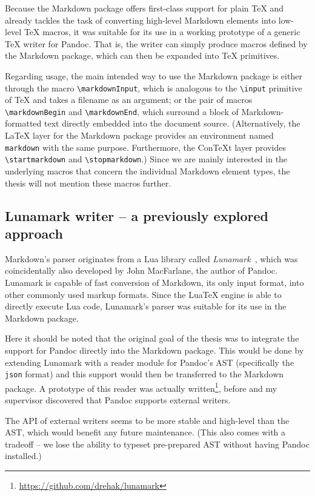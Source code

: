 \documentclass[
  digital,     %
  oneside,     %
  nosansbold,  %
  nocolorbold, %
  lof,         %
  nolot,       %
]{fithesis4}
\newcommand\macro[1]{\texttt{\textbackslash{}{#1}}}
\begin{document}
Because the Markdown package offers first-class support for plain \TeX{} and already tackles the task of converting high-level Markdown elements into low-level \TeX{} macros, it was suitable for its use in a working prototype of a generic \TeX{} writer for Pandoc. That is, the writer can simply produce macros defined by the Markdown package, which can then be expanded into \TeX{} primitives.

Regarding usage, the main intended way to use the Markdown package is either through the macro \macro{markdownInput}, which is analogous to the \macro{input} primitive of \TeX{} and takes a filename as an argument; or the pair of macros \macro{markdownBegin} and \macro{markdownEnd}, which surround a block of Markdown-formatted text directly embedded into the document source. (Alternatively, the \LaTeX{} layer for the Markdown package provides an environment named \texttt{markdown} with the same purpose. Furthermore, the Con\TeX{}t layer provides \macro{startmarkdown} and \macro{stopmarkdown}.) Since we are mainly interested in the underlying macros that concern the individual Markdown element types, the thesis will not mention these macros further.

\subsection{Lunamark writer -- a previously explored approach}
Markdown's parser originates from a Lua library called \emph{Lunamark}~\cite{lunamark}, which was coincidentally also developed by John MacFarlane, the author of Pandoc. Lunamark is capable of fast conversion of Markdown, its only input format, into other commonly used markup formats. Since the Lua\TeX{} engine is able to directly execute Lua code, \cite{luatex} Lunamark's parser was suitable for its use in the Markdown package.

Here it should be noted that the original goal of the thesis was to integrate the support for Pandoc directly into the Markdown package. This would be done by extending Lunamark with a reader module for Pandoc's AST (specifically the \texttt{json} format) and this support would then be transferred to the Markdown package. A prototype of this reader was actually written\footnote{\url{https://github.com/drehak/lunamark}}, before and my supervisor discovered that Pandoc supports external writers.

The API of external writers seems to be more stable and high-level than the AST, which would benefit any future maintenance. (This also comes with a tradeoff -- we lose the ability to typeset pre-prepared AST without having Pandoc installed.)
\end{document}
